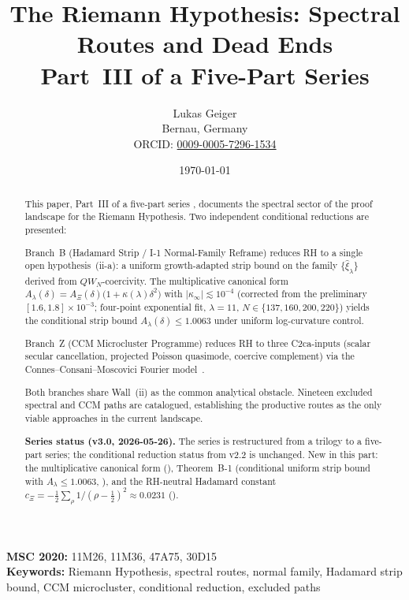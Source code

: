 \documentclass[12pt,a4paper]{article}
\title{The Riemann Hypothesis: Spectral Routes and Dead Ends\\[4pt]
\large Part~III of a Five-Part Series}
\author{Lukas Geiger\\
\small Bernau, Germany\\
\small ORCID: \href{https://orcid.org/0009-0005-7296-1534}{0009-0005-7296-1534}}
\date{\today}
\theoremstyle{definition}
\theoremstyle{remark}
\begin{document}
\overfullrule=0pt
\maketitle

\begin{abstract}\footnotesize
This paper, Part~III of a five-part series
\cite{Geiger2026partI,Geiger2026partII,Geiger2026partIV,Geiger2026partV},
documents the spectral sector of the proof landscape for the Riemann
Hypothesis. Two independent conditional reductions are presented:

Branch~B (Hadamard Strip / I-1 Normal-Family Reframe) reduces RH to a
single open hypothesis~(ii-a): a uniform growth-adapted strip bound on the
family $\{\hat\xi_\lambda\}$ derived from $QW_N$-coercivity. The
multiplicative canonical form
$A_\lambda(\delta) = A_\Xi(\delta)\bigl(1+\kappa(\lambda)\delta^2\bigr)$
with $|\kappa_\infty|\lesssim 10^{-4}$ (corrected from the preliminary
$[1.6,1.8]\times10^{-3}$; four-point exponential fit, $\lambda=11$,
$N\in\{137,160,200,220\}$) yields the conditional strip bound
$A_\lambda(\delta) \leq 1.0063$ under uniform log-curvature control.

Branch~Z (CCM Microcluster Programme) reduces RH to three C2ca-inputs
(scalar secular cancellation, projected Poisson quasimode, coercive
complement) via the Connes--Consani--Moscovici Fourier
model~\cite{ConnesMoscovici2023}.

Both branches share Wall~(ii) as the common analytical obstacle.
Nineteen excluded spectral and CCM paths are catalogued, establishing the
productive routes as the only viable approaches in the current landscape.

\medskip\noindent
\textbf{Series status (v3.0, 2026-05-26).}
The series is restructured from a trilogy to a five-part series; the
conditional reduction status from v2.2 is unchanged. New in this part:
the multiplicative canonical form (),
Theorem~B-1 (conditional uniform strip bound with
$A_\lambda \leq 1.0063$, ), and the RH-neutral Hadamard
constant
$c_\Xi = -\tfrac{1}{2}\sum_\rho 1/(\rho-\tfrac{1}{2})^2 \approx 0.0231$
().
\end{abstract}

{\footnotesize
\noindent\textbf{MSC 2020:} 11M26, 11M36, 47A75, 30D15\\
\textbf{Keywords:} Riemann Hypothesis, spectral routes, normal family,
Hadamard strip bound, CCM microcluster, conditional reduction,
excluded paths
}
\end{document}

